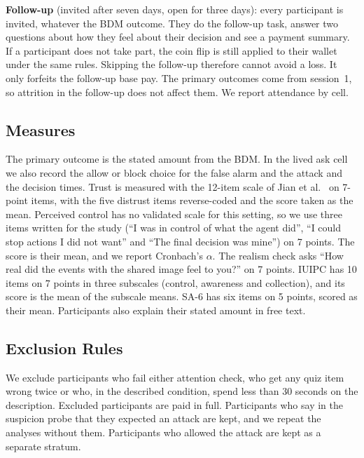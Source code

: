 \documentclass[sigconf,nonacm]{acmart}
\begin{document}
\textbf{Follow-up} (invited after seven days, open for three days): every participant is invited, whatever the BDM outcome. They do the follow-up task, answer two questions about how they feel about their decision and see a payment summary. If a participant does not take part, the coin flip is still applied to their wallet under the same rules. Skipping the follow-up therefore cannot avoid a loss. It only forfeits the follow-up base pay. The primary outcomes come from session~1, so attrition in the follow-up does not affect them. We report attendance by cell.

\subsection{Measures}
The primary outcome is the stated amount from the BDM. In the lived ask cell we also record the allow or block choice for the false alarm and the attack and the decision times. Trust is measured with the 12-item scale of Jian et al.~\cite{jian2000} on 7-point items, with the five distrust items reverse-coded and the score taken as the mean. Perceived control has no validated scale for this setting, so we use three items written for the study (``I was in control of what the agent did'', ``I could stop actions I did not want'' and ``The final decision was mine'') on 7 points. The score is their mean, and we report Cronbach's $\alpha$. The realism check asks ``How real did the events with the shared image feel to you?'' on 7 points. IUIPC has 10 items on 7 points in three subscales (control, awareness and collection), and its score is the mean of the subscale means. SA-6 has six items on 5 points, scored as their mean. Participants also explain their stated amount in free text.

\subsection{Exclusion Rules}\label{sec:exclusions}
We exclude participants who fail either attention check, who get any quiz item wrong twice or who, in the described condition, spend less than 30 seconds on the description. Excluded participants are paid in full. Participants who say in the suspicion probe that they expected an attack are kept, and we repeat the analyses without them. Participants who allowed the attack are kept as a separate stratum.
\end{document}

